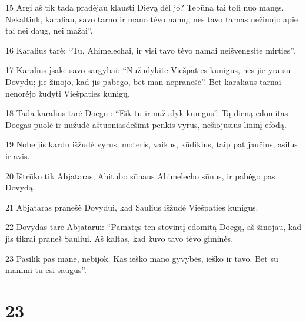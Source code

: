 \par 15 Argi aš tik tada pradėjau klausti Dievą dėl jo? Tebūna tai toli nuo manęs. Nekaltink, karaliau, savo tarno ir mano tėvo namų, nes tavo tarnas nežinojo apie tai nei daug, nei mažai”. 
\par 16 Karalius tarė: “Tu, Ahimelechai, ir visi tavo tėvo namai neišvengsite mirties”. 
\par 17 Karalius įsakė savo sargybai: “Nužudykite Viešpaties kunigus, nes jie yra su Dovydu; jie žinojo, kad jis pabėgo, bet man nepranešė”. Bet karaliaus tarnai nenorėjo žudyti Viešpaties kunigų. 
\par 18 Tada karalius tarė Doegui: “Eik tu ir nužudyk kunigus”. Tą dieną edomitas Doegas puolė ir nužudė aštuoniasdešimt penkis vyrus, nešiojusius lininį efodą. 
\par 19 Nobe jis kardu išžudė vyrus, moteris, vaikus, kūdikius, taip pat jaučius, asilus ir avis. 
\par 20 Ištrūko tik Abjataras, Ahitubo sūnaus Ahimelecho sūnus, ir pabėgo pas Dovydą. 
\par 21 Abjataras pranešė Dovydui, kad Saulius išžudė Viešpaties kunigus. 
\par 22 Dovydas tarė Abjatarui: “Pamatęs ten stovintį edomitą Doegą, aš žinojau, kad jis tikrai praneš Sauliui. Aš kaltas, kad žuvo tavo tėvo giminės. 
\par 23 Pasilik pas mane, nebijok. Kas ieško mano gyvybės, ieško ir tavo. Bet su manimi tu esi saugus”.



\chapter{23}

